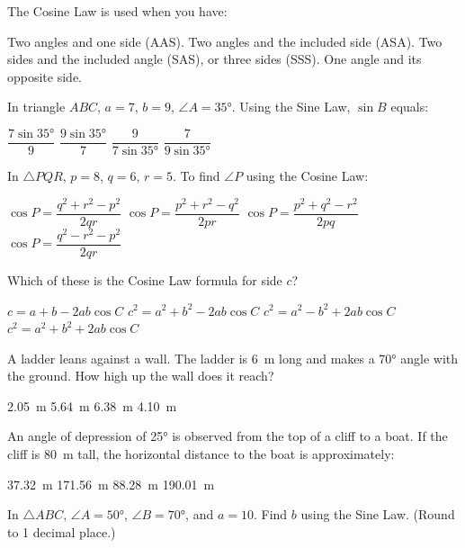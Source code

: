 \documentclass[addpoints]{exam}
\begin{document}
\begin{questions}
\question[1]
The Cosine Law is used when you have:
\begin{choices}
    \choice Two angles and one side (AAS).
    \choice Two angles and the included side (ASA).
    \correctchoice Two sides and the included angle (SAS), or three sides (SSS).
    \choice One angle and its opposite side.
\end{choices}

\question[1]
In triangle $ABC$, $a = 7$, $b = 9$, $\angle A = 35°$. Using the Sine Law, $\sin B$ equals:
\begin{choices}
    \choice $\dfrac{7\sin 35°}{9}$
    \correctchoice $\dfrac{9\sin 35°}{7}$
    \choice $\dfrac{9}{7\sin 35°}$
    \choice $\dfrac{7}{9\sin 35°}$
\end{choices}

\question[1]
In $\triangle PQR$, $p = 8$, $q = 6$, $r = 5$. To find $\angle P$ using the Cosine Law:
\begin{choices}
    \correctchoice $\cos P = \dfrac{q^2 + r^2 - p^2}{2qr}$
    \choice $\cos P = \dfrac{p^2 + r^2 - q^2}{2pr}$
    \choice $\cos P = \dfrac{p^2 + q^2 - r^2}{2pq}$
    \choice $\cos P = \dfrac{q^2 - r^2 - p^2}{2qr}$
\end{choices}

\question[1]
Which of these is the Cosine Law formula for side $c$?
\begin{choices}
    \choice $c = a + b - 2ab\cos C$
    \correctchoice $c^2 = a^2 + b^2 - 2ab\cos C$
    \choice $c^2 = a^2 - b^2 + 2ab\cos C$
    \choice $c^2 = a^2 + b^2 + 2ab\cos C$
\end{choices}

\question[1]
A ladder leans against a wall. The ladder is \SI{6}{m} long and makes a \ang{70} angle with the ground. How high up the wall does it reach?
\begin{choices}
    \choice \SI{2.05}{m}
    \correctchoice \SI{5.64}{m}
    \choice \SI{6.38}{m}
    \choice \SI{4.10}{m}
\end{choices}

\question[1]
An angle of depression of \ang{25} is observed from the top of a cliff to a boat. If the cliff is \SI{80}{m} tall, the horizontal distance to the boat is approximately:
\begin{choices}
    \choice \SI{37.32}{m}
    \correctchoice \SI{171.56}{m}
    \choice \SI{88.28}{m}
    \choice \SI{190.01}{m}
\end{choices}

\question[1]
In $\triangle ABC$, $\angle A = 50°$, $\angle B = 70°$, and $a = 10$. Find $b$ using the Sine Law. (Round to 1 decimal place.)
\begin{choices}
\end{choices}


\end{questions}
\end{document}
